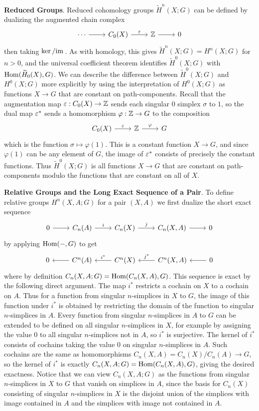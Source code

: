 \textbf{Reduced Groups}. Reduced cohomology groups $\widetilde{H}^n(X;G)$ can be defined by dualizing the augmented chain complex 
\[\begin{tikzcd}
\cdots\ar[r]&C_0(X)\ar[r,"\eps"]&\Z\ar[r]&0
\end{tikzcd}\]
then taking $\mathrm{ker}\,/\mathrm{im}\,$. As with homology, this gives $\widetilde{H}^n(X;G)=H^n(X;G)$ for $n>0$, and the universal coefficient theorem identifies $\widetilde{H}^0(X;G)$ with $\mathrm{Hom}(\widetilde{H}_0(X),G)$. We can describe the difference between $\widetilde{H}^0(X;G)$ and $H^0(X;G)$ more explicitly by using the interpretation of $H^0(X;G)$ as functions $X\to G$ that are constant on path-components. Recall that the augmentation map $\varepsilon:C_0(X)\to\mathbb{Z}$ sends each singular $0$ simplex $\sigma$ to $1$, so the dual map $\varepsilon^*$ sends a homomorphism $\varphi:\mathbb{Z}\to G$ to the composition
\[\begin{tikzcd}
C_0(X)\ar[r,"\eps"]&\Z\ar[r,"\varphi"]&G
\end{tikzcd}\]
which is the function $\sigma\mapsto\varphi(1)$. This is a constant function $X\to G$, and since $\varphi(1)$ can be any element of $G$, the image of $\varepsilon^*$ consists of precisely the constant functions. Thus $\widetilde{H}^0(X;G)$ is all functions $X\to G$ that are constant on path-components modulo the functions that are constant on all of $X$.\par
\textbf{Relative Groups and the Long Exact Sequence of a Pair}. To define relative groups $H^n(X,A;G)$ for a pair $(X,A)$ we first dualize the short exact sequence
\[\begin{tikzcd}
0\ar[r]&C_n(A)\ar[r,"i"]&C_n(X)\ar[r,"j"]&C_n(X,A)\ar[r]&0
\end{tikzcd}\]
by applying $\mathrm{Hom}(-,G)$ to get 
\[\begin{tikzcd}
0&C^n(A)\ar[l]&C^n(X)\ar[l,swap,"i^*"]&C^n(X,A)\ar[l,swap,"j^*"]&0\ar[l]
\end{tikzcd}\]
where by definition $C_n(X,A;G)=\mathrm{Hom}(C_n(X,A),G)$. This sequence is exact by the
following direct argument. The map $i^*$ restricts a cochain on $X$ to a cochain on $A$. Thus for a function from singular $n$-simplices in $X$ to $G$, the image of this function under $i^*$ is obtained by restricting the domain of the function to singular $n$-simplices in $A$. Every function from singular $n$-simplices in $A$ to $G$ can be extended to be defined on all singular $n$-simplices in $X$, for example by assigning the value $0$ to all singular $n$-simplices not in $A$, so $i^*$ is surjective. The kernel of $i^*$ consists of cochains taking the value $0$ on singular $n$-simplices in $A$. Such cochains are the same as homomorphisms $C_n(X,A)=C_n(X)/C_n(A)\to G$, so the kernel of $i^*$ is exactly $C_n(X,A;G)=\mathrm{Hom}(C_n(X,A),G)$, giving the desired exactness. Notice that we can view $C_n(X,A;G)$ as the functions from singular $n$-simplices in $X$ to $G$ that vanish on simplices in $A$, since the basis for $C_n(X)$ consisting of singular $n$-simplices in $X$ is the disjoint union of the simplices with image contained in $A$ and the simplices with image not contained in $A$.\par
